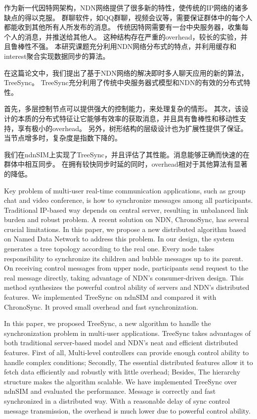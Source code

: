 ﻿
\begin{cnabstract}
作为新一代因特网架构，NDN网络提供了很多新的特性，使传统的IP网络的诸多缺点的得以克服。
群聊软件，如QQ群聊，视频会议等，需要保证群体中的每个人都能收到其他所有人所发布的消息。
传统因特网需要有一台中央服务器，收集每个人的消息，并推送给其他人。
这种结构存在严重的overhead，较长的实验，并且鲁棒性不强。
本研究课题充分利用NDN网络分布式的特点，并利用缓存和interest聚合实现数据同步的算法。

在这篇论文中，我们提出了基于NDN网络的解决即时多人聊天应用的新的算法，TreeSync。
TreeSync充分利用了传统中央服务器式模型和NDN的有效的分布式特性。

首先，多层控制节点可以提供强大的控制能力，来处理复杂的情形。
其次，该设计的本质的分布式特征让它能够有效率的获取消息，并且具有鲁棒性和移动性支持，享有极小的overhead。
另外，树形结构的层级设计也为扩展性提供了保证。当节点增多时，复杂度是指数下降的。

我们在ndnSIM上实现了TreeSync，并且评估了其性能。消息能够正确而快速的在群体中相互同步。
在拥有较快同步时延的同时，overhead相对于其他算法有显著的降低。

\end{cnabstract}


\begin{enabstract}

Key problem of multi-user real-time communication applications,
such as group chat and video conference,
is how to synchronize messages among all participants.
Traditional IP-based way depends on central server, resulting in unbalanced link burden and robust problem.
A recent solution on NDN, ChronoSync, has several crucial limitations.
In this paper, we propose a new distributed algorithm based on Named Data Network to address this problem.
In our design, the system generates a tree topology according to the real one.
Every node takes responsibility to synchronize its children and bubble messages up to its parent.
On receiving control messages from upper node,
participants send request to the real message directly, taking advantage of NDN's consumer-driven design.
This method synthesizes the powerful control ability of servers and NDN's distributed features.
We implemented TreeSync on ndnSIM and compared it with ChronoSync.
It proved small overhead and fast synchronization.

In this paper, we proposed TreeSync, a new algorithm to handle the synchronization problem in multi-user applications.
TreeSync takes advantages of both traditional server-based model and NDN's neat and efficient distributed features.
First of all, Multi-level controllers can provide enough control ability to handle complex conditions;
Secondly, The essential distributed features allow it to fetch data efficiently and robustly with little overhead;
Besides, The hierarchy structure makes the algorithm scalable.
We have implemented TreeSync over ndnSIM and evaluated the performance.
Message is correctly and fast synchronized in a distributed way.
With a reasonable delay of sync control message transmission,
the overhead is much lower due to powerful control ability.


\end{enabstract}
